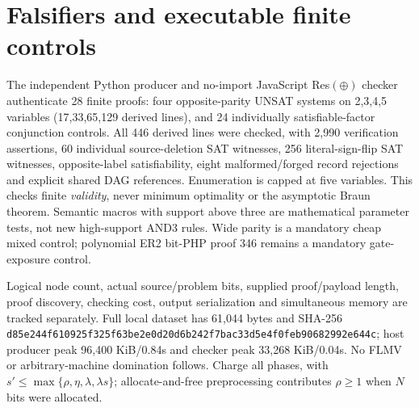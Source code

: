 \documentclass[11pt]{article}
\begin{document}
\section*{Falsifiers and executable finite controls}
The independent Python producer and no-import JavaScript Res$(\oplus)$ checker authenticate 28 finite proofs: four opposite-parity UNSAT systems on 2,3,4,5 variables (17,33,65,129 derived lines), and 24 individually satisfiable-factor conjunction controls. All 446 derived lines were checked, with 2,990 verification assertions, 60 individual source-deletion SAT witnesses, 256 literal-sign-flip SAT witnesses, opposite-label satisfiability, eight malformed/forged record rejections and explicit shared DAG references. Enumeration is capped at five variables. This checks finite \emph{validity}, never minimum optimality or the asymptotic Braun theorem. Semantic macros with support above three are mathematical parameter tests, not new high-support AND3 rules. Wide parity is a mandatory cheap mixed control; polynomial ER2 bit-PHP proof 346 remains a mandatory gate-exposure control.

Logical node count, actual source/problem bits, supplied proof/payload length, proof discovery, checking cost, output serialization and simultaneous memory are tracked separately. Full local dataset has 61,044 bytes and SHA-256 \texttt{d85e244f610925f325f63be2e0d20d6b242f7bac33d5e4f0feb90682992e644c}; host producer peak 96,400 KiB/0.84s and checker peak 33,268 KiB/0.04s. No FLMV or arbitrary-machine domination follows. Charge all phases, with $s'\le\max\{\rho,\eta,\lambda,\lambda s\}$; allocate-and-free preprocessing contributes $\rho\ge1$ when $N$ bits were allocated.
\end{document}
